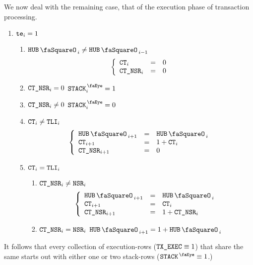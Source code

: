 We now deal with the remaining case, that of the execution phase of transaction processing.
\begin{enumerate}[resume]
	\item \If $\texttt{te}_{i} = 1$ \Then
		\begin{enumerate}
			\item \If $\hubStamp_{i} \neq \hubStamp_{i - 1}$ \Then 
				\[
					\left\{ \begin{array}{lcl}
						\texttt{CT}                  _{i} & = & 0 \\
						\texttt{CT}\texttt{\_}\texttt{NSR} _{i} & = & 0 \\
					\end{array} \right.
				\]
			\item \If $\texttt{CT}\texttt{\_}\texttt{NSR} _{i} =    0$ \Then $\peekStack _{i} = 1$
			\item \If $\texttt{CT}\texttt{\_}\texttt{NSR} _{i} \neq 0$ \Then $\peekStack _{i} = 0$
			\item \If $\texttt{CT}_{i} \neq \texttt{TLI}_{i}$ \Then 
				\[
					\left\{ \begin{array}{lcl}
						\hubStamp            _{i + 1} & = & \hubStamp_{i} \\
						\ct                  _{i + 1} & = & 1 + \ct_{i}   \\
						\nonStackRowsCounter _{i + 1} & = & 0             \\
					\end{array} \right.
				\]
			\item \If $\texttt{CT}_{i} = \texttt{TLI}_{i}$ \Then 
				\begin{enumerate}
					\item \If $\texttt{CT}\texttt{\_}\texttt{NSR}_{i} \neq \texttt{NSR}_{i}$ \Then
						\[
							\left\{ \begin{array}{lcl}
								\hubStamp            _{i + 1} & = & \hubStamp_{i}                \\
								\ct                  _{i + 1} & = & \ct_{i}                      \\
								\nonStackRowsCounter _{i + 1} & = & 1 + \nonStackRowsCounter_{i} \\
							\end{array} \right.
						\]
					\item \If $\texttt{CT}\texttt{\_}\texttt{NSR}_{i} = \texttt{NSR}_{i}$ \Then $\hubStamp_{i + 1} = 1 + \hubStamp_{i}$
				\end{enumerate}
		\end{enumerate}
\end{enumerate}
\saNote{} It follows that every collection of execution-rows ($\texttt{TX}\texttt{\_EXEC} \equiv 1$) that share the same \hubStamp{} starts out with either one or two stack-rows ($\peekStack \equiv 1$.)

